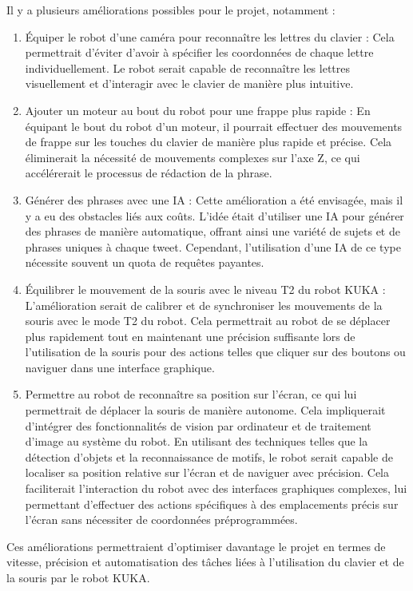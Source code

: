 \documentclass[twoside]{article}
\begin{document}
\begin{multicols}{2}
Il y a plusieurs améliorations possibles pour le projet, notamment :
\begin{enumerate}
    \item Équiper le robot d'une caméra pour reconnaître les lettres du clavier : Cela permettrait d'éviter d'avoir à spécifier les coordonnées de chaque lettre individuellement. Le robot serait capable de reconnaître les lettres visuellement et d'interagir avec le clavier de manière plus intuitive.
    \item Ajouter un moteur au bout du robot pour une frappe plus rapide : En équipant le bout du robot d'un moteur, il pourrait effectuer des mouvements de frappe sur les touches du clavier de manière plus rapide et précise. Cela éliminerait la nécessité de mouvements complexes sur l'axe Z, ce qui accélérerait le processus de rédaction de la phrase.
    \item Générer des phrases avec une IA : Cette amélioration a été envisagée, mais il y a eu des obstacles liés aux coûts. L'idée était d'utiliser une IA pour générer des phrases de manière automatique, offrant ainsi une variété de sujets et de phrases uniques à chaque tweet. Cependant, l'utilisation d'une IA de ce type nécessite souvent un quota de requêtes payantes.
    \item Équilibrer le mouvement de la souris avec le niveau T2 du robot KUKA : L'amélioration serait de calibrer et de synchroniser les mouvements de la souris avec le mode T2 du robot. Cela permettrait au robot de se déplacer plus rapidement tout en maintenant une précision suffisante lors de l'utilisation de la souris pour des actions telles que cliquer sur des boutons ou naviguer dans une interface graphique.
    \item Permettre au robot de reconnaître sa position sur l'écran, ce qui lui permettrait de déplacer la souris de manière autonome. Cela impliquerait d'intégrer des fonctionnalités de vision par ordinateur et de traitement d'image au système du robot. En utilisant des techniques telles que la détection d'objets et la reconnaissance de motifs, le robot serait capable de localiser sa position relative sur l'écran et de naviguer avec précision. Cela faciliterait l'interaction du robot avec des interfaces graphiques complexes, lui permettant d'effectuer des actions spécifiques à des emplacements précis sur l'écran sans nécessiter de coordonnées préprogrammées.
\end{enumerate}

Ces améliorations permettraient d'optimiser davantage le projet en termes de vitesse, précision et automatisation des tâches liées à l'utilisation du clavier et de la souris par le robot KUKA.


\end{multicols}
\end{document}
